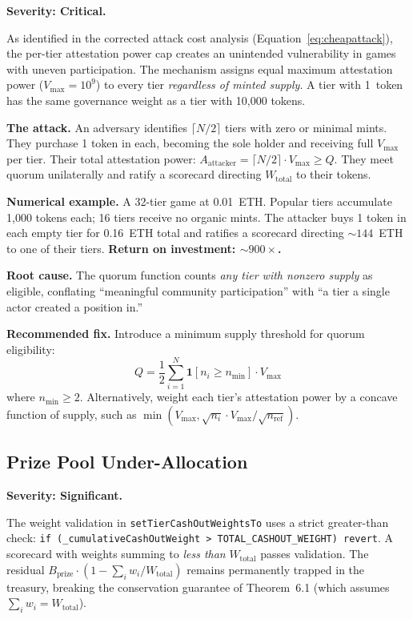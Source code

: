 \documentclass[11pt,a4paper]{article}
\begin{document}
\textbf{Severity: Critical.}

As identified in the corrected attack cost analysis (Equation~\ref{eq:cheapattack}), the per-tier attestation power cap creates an unintended vulnerability in games with uneven participation. The mechanism assigns equal maximum attestation power ($V_{\text{max}} = 10^9$) to every tier \emph{regardless of minted supply}. A tier with 1~token has the same governance weight as a tier with 10,000 tokens.

\textbf{The attack.} An adversary identifies $\lceil N/2 \rceil$ tiers with zero or minimal mints. They purchase 1 token in each, becoming the sole holder and receiving full $V_{\text{max}}$ per tier. Their total attestation power: $A_{\text{attacker}} = \lceil N/2 \rceil \cdot V_{\text{max}} \geq Q$. They meet quorum unilaterally and ratify a scorecard directing $W_{\text{total}}$ to their tokens.

\textbf{Numerical example.} A 32-tier game at 0.01~ETH. Popular tiers accumulate 1,000 tokens each; 16 tiers receive no organic mints. The attacker buys 1 token in each empty tier for 0.16~ETH total and ratifies a scorecard directing ${\sim}144$~ETH to one of their tiers. \textbf{Return on investment: ${\sim}900\times$.}

\textbf{Root cause.} The quorum function counts \emph{any tier with nonzero supply} as eligible, conflating ``meaningful community participation'' with ``a tier a single actor created a position in.''

\textbf{Recommended fix.} Introduce a minimum supply threshold for quorum eligibility:
\begin{equation}
Q = \frac{1}{2} \sum_{i=1}^{N} \mathbf{1}\!\left[n_i \geq n_{\text{min}}\right] \cdot V_{\text{max}}
\end{equation}
where $n_{\text{min}} \geq 2$. Alternatively, weight each tier's attestation power by a concave function of supply, such as $\min(V_{\text{max}}, \sqrt{n_i} \cdot V_{\text{max}} / \sqrt{n_{\text{ref}}})$.

\subsection{Prize Pool Under-Allocation}

\textbf{Severity: Significant.}

The weight validation in \texttt{setTierCashOutWeightsTo} uses a strict greater-than check: \texttt{if (\_cumulativeCashOutWeight > TOTAL\_CASHOUT\_WEIGHT) revert}. A scorecard with weights summing to \emph{less than} $W_{\text{total}}$ passes validation. The residual $B_{\text{prize}} \cdot (1 - \sum_i w_i / W_{\text{total}})$ remains permanently trapped in the treasury, breaking the conservation guarantee of Theorem~6.1 (which assumes $\sum_i w_i = W_{\text{total}}$).
\end{document}
